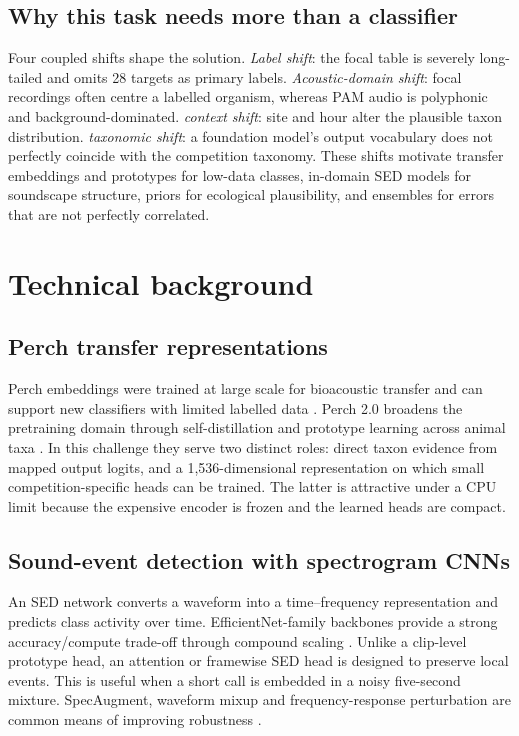 \documentclass[10pt,a4paper]{article}
\begin{document}
\subsection{Why this task needs more than a classifier}
Four coupled shifts shape the solution. \emph{Label shift}: the focal table is severely long-tailed and omits 28 targets as primary labels. \emph{Acoustic-domain shift}: focal recordings often centre a labelled organism, whereas PAM audio is polyphonic and background-dominated. \emph{context shift}: site and hour alter the plausible taxon distribution. \emph{taxonomic shift}: a foundation model's output vocabulary does not perfectly coincide with the competition taxonomy. These shifts motivate transfer embeddings and prototypes for low-data classes, in-domain SED models for soundscape structure, priors for ecological plausibility, and ensembles for errors that are not perfectly correlated.

\section{Technical background}
\subsection{Perch transfer representations}
Perch embeddings were trained at large scale for bioacoustic transfer and can support new classifiers with limited labelled data \cite{ghani2023perch}. Perch 2.0 broadens the pretraining domain through self-distillation and prototype learning across animal taxa \cite{vanmerrienboer2025perch2}. In this challenge they serve two distinct roles: direct taxon evidence from mapped output logits, and a 1,536-dimensional representation on which small competition-specific heads can be trained. The latter is attractive under a CPU limit because the expensive encoder is frozen and the learned heads are compact.

\subsection{Sound-event detection with spectrogram CNNs}
An SED network converts a waveform into a time--frequency representation and predicts class activity over time. EfficientNet-family backbones provide a strong accuracy/compute trade-off through compound scaling \cite{tan2019efficientnet}. Unlike a clip-level prototype head, an attention or framewise SED head is designed to preserve local events. This is useful when a short call is embedded in a noisy five-second mixture. SpecAugment, waveform mixup and frequency-response perturbation are common means of improving robustness \cite{park2019specaugment,zhang2018mixup}.
\end{document}
